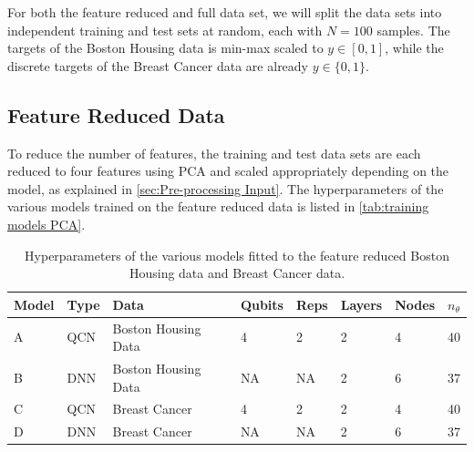 For both the feature reduced and full data set, we will split the data sets into independent training and test sets at random, each with $N=100$ samples. The targets of the Boston Housing data is min-max scaled to $y \in [0,1]$, while the discrete targets of the Breast Cancer data are already $y \in \{0,1\}$.

\subsection{Feature Reduced Data}\label{sec:Feature Reduced Data}
To reduce the number of features, the training and test data sets are each reduced to four features using PCA and scaled appropriately depending on the model, as explained in \autoref{sec:Pre-processing Input}. The hyperparameters of the various models trained on the feature reduced data is listed in \autoref{tab:training models PCA}.

\begin{table}[H]
\centering
\caption{Hyperparameters of the various models fitted to the feature reduced Boston Housing data and Breast Cancer data.} 
\begin{tabular}{|l|l|l|l|l|l|l|l|}
\hline
Model& Type& Data& Qubits& Reps& Layers & Nodes &$n_{\theta}$ \\ \hline
A    & QCN & Boston Housing Data  & 4     & 2  &2     & 4& 40   \\ \hline
B    & DNN & Boston Housing Data  & NA    & NA &2     & 6& 37 \\ \Xhline{2\arrayrulewidth}
C    & QCN & Breast Cancer        & 4     & 2  &2     & 4& 40  \\ \hline
D    & DNN & Breast Cancer        & NA    & NA &2     & 6& 37  \\ \hline
\end{tabular}

\label{tab:training models PCA}
\end{table}


%        

